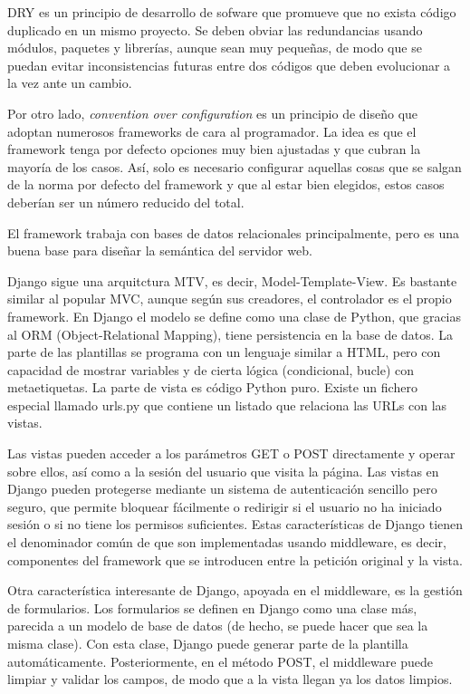 \documentclass[12pt]{report} %
\begin{document}
DRY\cite{wiki:dry} es un principio de desarrollo de sofware que promueve que no exista código duplicado en un mismo proyecto. Se deben obviar las redundancias usando módulos, paquetes y librerías, aunque sean muy pequeñas, de modo que se puedan evitar inconsistencias futuras entre dos códigos que deben evolucionar a la vez ante un cambio.

Por otro lado, \textit{convention over configuration}\cite{wiki:coc} es un principio de diseño que adoptan numerosos frameworks de cara al programador. La idea es que el framework tenga por defecto opciones muy bien ajustadas y que cubran la mayoría de los casos. Así, solo es necesario configurar aquellas cosas que se salgan de la norma por defecto del framework y que al estar bien elegidos, estos casos deberían ser un número reducido del total.

El framework trabaja con bases de datos relacionales principalmente, pero es una buena base para diseñar la semántica del servidor web.

Django sigue una arquitctura MTV, es decir, Model-Template-View. Es bastante similar al popular MVC, aunque según sus creadores, el controlador es el propio framework.
En Django el modelo se define como una clase de Python, que gracias al ORM (Object-Relational Mapping), tiene persistencia en la base de datos. La parte de las plantillas se programa con un lenguaje similar a HTML, pero con capacidad de mostrar variables
y de cierta lógica (condicional, bucle) con metaetiquetas. La parte de vista es código Python puro. Existe un fichero especial llamado urls.py que contiene un listado que relaciona las URLs con las vistas.

Las vistas pueden acceder a los parámetros GET o POST directamente y operar sobre ellos, así como a la sesión del usuario que visita la página.
Las vistas en Django pueden protegerse mediante un sistema de autenticación sencillo pero seguro, que permite bloquear fácilmente o redirigir si el usuario no ha iniciado sesión o si no tiene los permisos suficientes.
Estas características de Django tienen el denominador común de que son implementadas usando middleware, es decir, componentes del framework que se introducen entre la petición original
y la vista.

Otra característica interesante de Django, apoyada en el middleware, es la gestión de formularios. Los formularios se definen en Django como una clase más, parecida a un modelo de base de datos (de hecho, se puede hacer que sea la misma clase).
Con esta clase, Django puede generar parte de la plantilla automáticamente. Posteriormente, en el método POST, el middleware puede limpiar y validar los campos, de modo que a la vista llegan ya los datos limpios.
\end{document}

